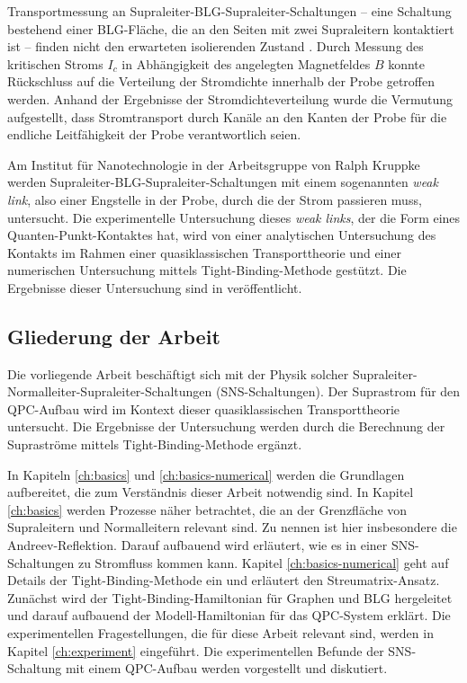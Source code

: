 Transportmessung an Supraleiter-BLG-Supraleiter-Schaltungen -- eine Schaltung bestehend einer BLG-Fl\"ache, die an den Seiten mit zwei Supraleitern kontaktiert ist -- finden nicht den erwarteten isolierenden Zustand \cite{Zhu2017}. Durch Messung des kritischen Stroms $I_c$ in Abh\"angigkeit des angelegten Magnetfeldes $B$ konnte R\"uckschluss auf die Verteilung der Stromdichte innerhalb der Probe getroffen werden. Anhand der Ergebnisse der Stromdichteverteilung wurde die Vermutung aufgestellt, dass Stromtransport durch Kan\"ale an den Kanten der Probe f\"ur die endliche Leitf\"ahigkeit der Probe verantwortlich seien. 

Am Institut f\"ur Nanotechnologie in der Arbeitsgruppe von Ralph Kruppke werden Supraleiter-BLG-Supraleiter-Schaltungen mit einem sogenannten \emph{weak link}, also einer Engstelle in der Probe, durch die der Strom passieren muss, untersucht. Die experimentelle Untersuchung dieses \emph{weak links}, der die Form eines Quanten-Punkt-Kontaktes hat, wird von einer analytischen Untersuchung des Kontakts im Rahmen einer quasiklassischen Transporttheorie und einer numerischen Untersuchung mittels Tight-Binding-Methode gest\"utzt. Die Ergebnisse dieser Untersuchung sind in \cite{Kraft2017} ver\"offentlicht. 


\subsection*{Gliederung der Arbeit} 

Die vorliegende Arbeit besch\"aftigt sich mit der Physik solcher Supraleiter-Normalleiter-Supraleiter-Schaltungen (SNS-Schaltungen). Der Suprastrom f\"ur den QPC-Aufbau wird im Kontext dieser quasiklassischen Transporttheorie untersucht. Die Ergebnisse der Untersuchung werden durch die Berechnung der Suprastr\"ome mittels Tight-Binding-Methode erg\"anzt.

In Kapiteln \ref{ch:basics} und  \ref{ch:basics-numerical} werden die Grundlagen aufbereitet, die zum Verst\"andnis dieser Arbeit notwendig sind. In Kapitel \ref{ch:basics} werden Prozesse n\"aher betrachtet, die an der Grenzfl\"ache von Supraleitern und Normalleitern relevant sind. Zu nennen ist hier insbesondere die Andreev-Reflektion. Darauf aufbauend wird erl\"autert, wie es in einer SNS-Schaltungen zu Stromfluss kommen kann. Kapitel  \ref{ch:basics-numerical} geht auf Details der Tight-Binding-Methode ein und erl\"autert den Streumatrix-Ansatz. Zun\"achst wird der Tight-Binding-Hamiltonian f\"ur Graphen und BLG hergeleitet und darauf aufbauend der Modell-Hamiltonian f\"ur das QPC-System erkl\"art. Die experimentellen Fragestellungen, die f\"ur diese Arbeit relevant sind, werden in Kapitel \ref{ch:experiment} eingef\"uhrt. Die experimentellen Befunde der SNS-Schaltung mit einem QPC-Aufbau werden vorgestellt und diskutiert.

